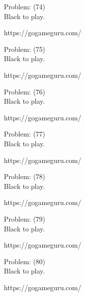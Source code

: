 \documentclass[11pt]{article}
\begin{document}
\begin{minipage}[t]{0.5\textwidth}
  {\centering
  
Problem: (74)\\
Black to play.

https://gogameguru.com/\\
  }
\end{minipage}
\begin{minipage}[t]{0.5\textwidth}
  {\centering
  
Problem: (75)\\
Black to play.

https://gogameguru.com/\\
  }
\end{minipage}
\begin{minipage}[t]{0.5\textwidth}
  {\centering
  
Problem: (76)\\
Black to play.

https://gogameguru.com/\\
  }
\end{minipage}
\begin{minipage}[t]{0.5\textwidth}
  {\centering
  
Problem: (77)\\
Black to play.

https://gogameguru.com/\\
  }
\end{minipage}
\begin{minipage}[t]{0.5\textwidth}
  {\centering
  
Problem: (78)\\
Black to play.

https://gogameguru.com/\\
  }
\end{minipage}
\begin{minipage}[t]{0.5\textwidth}
  {\centering
  
Problem: (79)\\
Black to play.

https://gogameguru.com/\\
  }
\end{minipage}
\begin{minipage}[t]{0.5\textwidth}
  {\centering
  
Problem: (80)\\
Black to play.

https://gogameguru.com/\\
  }
\end{minipage}
\end{document}
